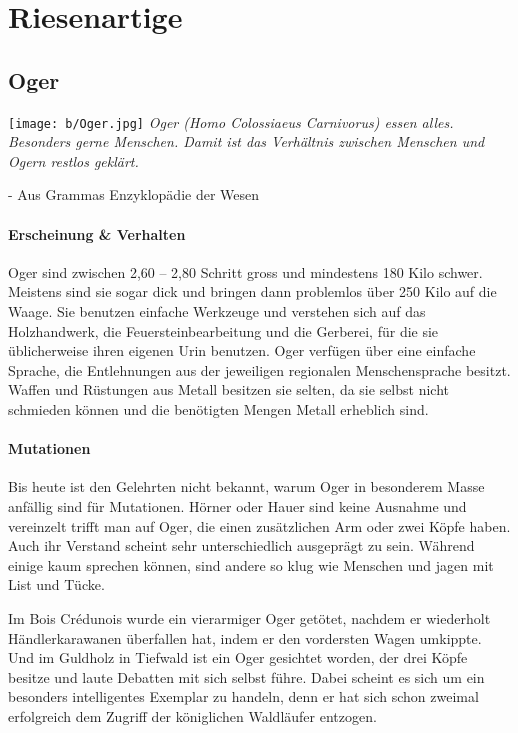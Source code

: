 \documentclass[10pt,twoside,twocolumn,openany]{book}
\begin{document}
\newpage \section{Riesenartige}
\begin{multicols}{2}
	\subsection{Oger}
	\texttt{[image: b/Oger.jpg]}
	\textit{Oger (Homo Colossiaeus Carnivorus) essen alles. Besonders gerne Menschen. Damit ist das Verhältnis zwischen Menschen und Ogern restlos geklärt.}
	\begin{flushright}
		- Aus Grammas Enzyklopädie der Wesen
	\end{flushright}
	
	\paragraph{Erscheinung \& Verhalten}
	Oger sind zwischen 2,60 – 2,80 Schritt gross und mindestens 180 Kilo schwer. Meistens sind sie sogar dick und bringen dann problemlos über 250 Kilo auf die Waage. Sie benutzen einfache Werkzeuge und verstehen sich auf das Holzhandwerk, die Feuersteinbearbeitung und die Gerberei, für die sie üblicherweise ihren eigenen Urin benutzen.
	Oger verfügen über eine einfache Sprache, die Entlehnungen aus der jeweiligen regionalen Menschensprache besitzt. Waffen und Rüstungen aus Metall besitzen sie selten, da sie selbst nicht schmieden können und die benötigten Mengen Metall erheblich sind.
	
	\paragraph{Mutationen}
	Bis heute ist den Gelehrten nicht bekannt, warum Oger in besonderem Masse anfällig sind für Mutationen. Hörner oder Hauer sind keine Ausnahme und vereinzelt trifft man auf Oger, die einen zusätzlichen Arm oder zwei Köpfe haben. Auch ihr Verstand scheint sehr unterschiedlich ausgeprägt zu sein. Während einige kaum sprechen können, sind andere so klug wie Menschen und jagen mit List und Tücke.
	
	Im Bois Crédunois wurde ein vierarmiger Oger getötet, nachdem er wiederholt Händlerkarawanen überfallen hat, indem er den vordersten Wagen umkippte. Und im Guldholz in Tiefwald ist ein Oger gesichtet worden, der drei Köpfe besitze und laute Debatten mit sich selbst führe. Dabei scheint es sich um ein besonders intelligentes Exemplar zu handeln, denn er hat sich schon zweimal erfolgreich dem Zugriff der königlichen Waldläufer entzogen.
	

\end{multicols}
\end{document}
